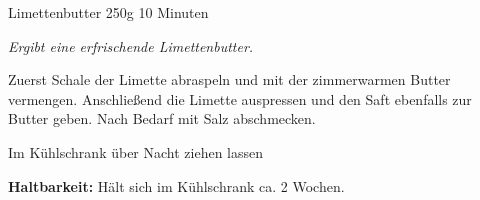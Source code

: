 \begin{recipe}{Limettenbutter} {250g} {10 Minuten}

\freeform
\textit{Ergibt eine erfrischende Limettenbutter.}


Zuerst Schale der Limette abraspeln und mit der zimmerwarmen Butter vermengen.
Anschließend die Limette auspressen und den Saft ebenfalls zur Butter geben.
Nach Bedarf mit Salz abschmecken.

\newstep
Im Kühlschrank über Nacht ziehen lassen

\freeform
\hrulefill

\freeform 
\textbf{Haltbarkeit:}
Hält sich im Kühlschrank ca. 2 Wochen.

\end{recipe}
